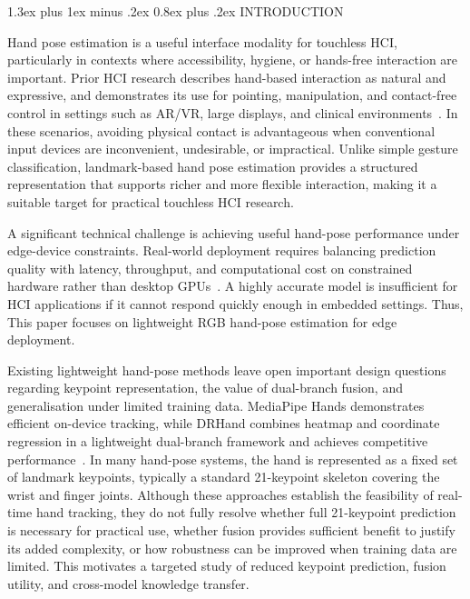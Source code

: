 \documentclass[10pt,letterpaper]{article}
\makeatletter
\renewcommand\section{\@startsection{section}{1}{\z@}%
  {1.3ex plus 1ex minus .2ex}%
  {0.8ex plus .2ex}%
  {\centering\normalfont\small\scshape}}
\makeatother
\begin{document}
\section{INTRODUCTION}

\medskip
Hand pose estimation is a useful interface modality for touchless HCI, particularly in contexts where accessibility, hygiene, or hands-free interaction are important. Prior HCI research describes hand-based interaction as natural and expressive, and demonstrates its use for pointing, manipulation, and contact-free control in settings such as AR/VR, large displays, and clinical environments~\cite{vuletic,wachs,li_vr}. In these scenarios, avoiding physical contact is advantageous when conventional input devices are inconvenient, undesirable, or impractical. Unlike simple gesture classification, landmark-based hand pose estimation provides a structured representation that supports richer and more flexible interaction, making it a suitable target for practical touchless HCI research.

\medskip
A significant technical challenge is achieving useful hand-pose performance under edge-device constraints. Real-world deployment requires balancing prediction quality with latency, throughput, and computational cost on constrained hardware rather than desktop GPUs~\cite{attentionlite,srhandnet,dualreg}. A highly accurate model is insufficient for HCI applications if it cannot respond quickly enough in embedded settings. Thus, This paper focuses on lightweight RGB hand-pose estimation for edge deployment.

\medskip
Existing lightweight hand-pose methods leave open important design questions regarding keypoint representation, the value of dual-branch fusion, and generalisation under limited training data. MediaPipe Hands demonstrates efficient on-device tracking, while DRHand combines heatmap and coordinate regression in a lightweight dual-branch framework and achieves competitive performance~\cite{mediapipe,dualreg}. In many hand-pose systems, the hand is represented as a fixed set of landmark keypoints, typically a standard 21-keypoint skeleton covering the wrist and finger joints. Although these approaches establish the feasibility of real-time hand tracking, they do not fully resolve whether full 21-keypoint prediction is necessary for practical use, whether fusion provides sufficient benefit to justify its added complexity, or how robustness can be improved when training data are limited. This motivates a targeted study of reduced keypoint prediction, fusion utility, and cross-model knowledge transfer.
\end{document}
